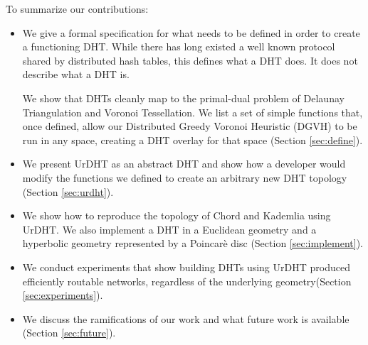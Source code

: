 \documentclass[11pt,conference]{IEEEtran}
\begin{document}
%
%

To summarize our contributions:
\begin{itemize}
	\item We give a formal specification for what needs to be defined in order to create a functioning DHT.
	While there has long existed a well known protocol shared by distributed hash tables, this defines what a DHT does.
	It does not describe what a DHT is.
	
	We show that DHTs cleanly map to the primal-dual problem of Delaunay Triangulation and Voronoi Tessellation.
	We list a set of simple functions that, once defined, allow our Distributed Greedy Voronoi Heuristic (DGVH) to be run in any space, creating a DHT overlay for that space (Section \ref{sec:define}).
	
	\item We present UrDHT as an abstract DHT and show how a developer would modify the functions we defined to create an arbitrary new DHT topology (Section \ref{sec:urdht}).
	
	\item We show how to reproduce the topology of Chord and Kademlia using UrDHT.
	We also implement a DHT in a Euclidean geometry and a hyperbolic geometry represented by a Poincar\`{e} disc (Section \ref{sec:implement}).
	\item We conduct experiments that show building DHTs using UrDHT produced efficiently routable networks, regardless of the underlying geometry(Section \ref{sec:experiments}). 
	\item We discuss the ramifications of our work and what future work is available (Section \ref{sec:future}).
\end{itemize}
\end{document}
